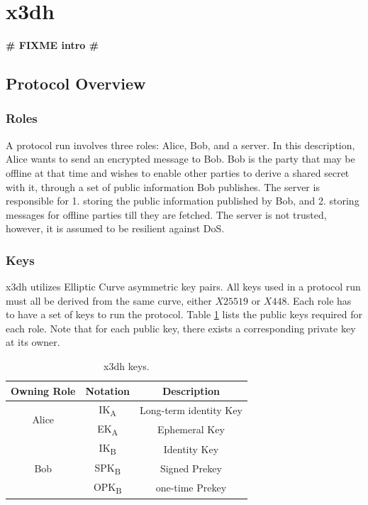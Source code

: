\section{\acrfull*{x3dh}}
\textbf{\LARGE \# FIXME intro \#}
\label{ch:x3dh}

\subsection{Protocol Overview}
\subsubsection{Roles}
A protocol run involves three roles: Alice, Bob, and a server. In this description, Alice wants to send an encrypted message to Bob. Bob is the party that may be offline at that time and wishes to enable other parties to derive a shared secret with it, through a set of public information Bob publishes. The server is responsible for 1. storing the public information published by Bob, and 2. storing messages for offline parties till they are fetched. The server is not trusted, however, it is assumed to be resilient against DoS. %
\subsubsection{Keys}
\gls{x3dh} utilizes Elliptic Curve asymmetric key pairs. All keys used in a protocol run must all be derived from the same curve, either $X25519$ or $X448$. Each role has to have a set of keys to run the protocol. Table \ref{tab:x3dhkeys} lists the public keys required for each role. Note that for each public key, there exists a corresponding private key at its owner.

\begin{table}
	\centering
	\begin{tabular}{|c|c|c|}
		
		\hline
	\rowcolor[rgb]{ .745,  .804,  .843}	Owning Role & Notation				 & Description 			  \\\hline\hline
		\multirow{2}{*}{Alice} & IK\textsubscript{A} 	 & Long-term identity Key \\
		& EK\textsubscript{A} 	 & Ephemeral Key 		  \\\hline
		\multirow{3}{*}{Bob}  & IK\textsubscript{B} 	 & Identity Key 		  \\
		& SPK\textsubscript{B} 	 & Signed Prekey 		  \\
		& OPK\textsubscript{B} 	 & one-time Prekey 		  \\ \hline
		
	\end{tabular}
	\caption{\gls{x3dh} keys.}
	\label{tab:x3dhkeys}
\end{table}

